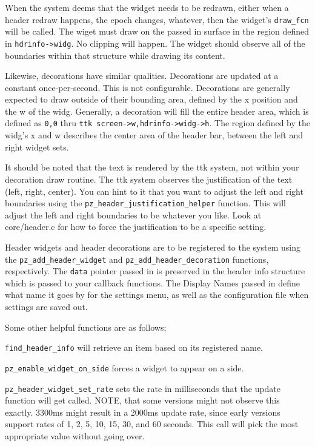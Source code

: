 \documentclass[12pt,letterpaper]{report}
\begin{document}
When the system deems that the widget needs to be redrawn, either
when a header redraw happens, the epoch changes, whatever, then the
widget's \verb|draw_fcn| will be called.  The wiget must draw on the 
passed in surface in the region defined in \verb|hdrinfo->widg|.  No
clipping will happen.  The widget should observe all of the boundaries
within that structure while drawing its content.

Likewise, decorations have similar qualities.  Decorations are
updated at a constant once-per-second.  This is not configurable.
Decorations are generally expected to draw outside of their bounding
area, defined by the x position and the w of the widg.  Generally,
a decoration will fill the entire header area, which is defined as
\verb|0,0| thru \verb|ttk screen->w,hdrinfo->widg->h|.  The region
defined by the widg's x and w describes the center area of the
header bar, between the left and right widget sets.

It should be noted that the text is rendered by the ttk system, not
within your decoration draw routine.  The ttk system observes the
justification of the text (left, right, center).  You can hint to
it that you want to adjust the left and right boundaries using the
\verb|pz_header_justification_helper| function.  This will adjust
the left and right boundaries to be whatever you like.  Look at
core/header.c for how to force the justification to be a specific
setting.

Header widgets and header decorations are to be registered to the
system using the \verb|pz_add_header_widget| and
\verb|pz_add_header_decoration| functions, respectively.  The
\verb|data| pointer passed in is preserved in the header info
structure which is passed to your callback functions.
The Display Names passed in define what name it goes by for the 
settings menu, as well as the configuration file when settings are
saved out.

Some other helpful functions are as follows;

\verb|find_header_info| will retrieve an item based on its registered name.

\verb|pz_enable_widget_on_side| forces a widget to appear on a side.

\verb|pz_header_widget_set_rate| sets the rate in milliseconds that
the update function will get called. NOTE, that some versions might
not observe this exactly.  3300ms might result in a 2000ms update
rate, since early versions support rates of 1, 2, 5, 10, 15, 30,
and 60 seconds.  This call will pick the most appropriate value
without going over.
\end{document}
